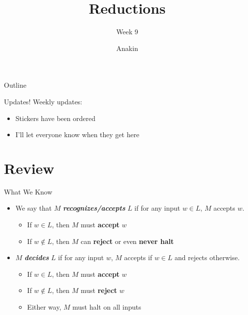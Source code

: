 \documentclass[aspectratio=169]{beamer}
\title{Reductions}
\subtitle{Week 9}
\author{Anakin}
\date{}
\begin{document}

\begin{frame}
\titlepage
\end{frame}

\begin{frame}{Outline}
  \tableofcontents
\end{frame}

\begin{frame}{Updates!}
  Weekly updates: \pause
  \begin{itemize}
    \item Stickers have been ordered
    \item I'll let everyone know when they get here
  \end{itemize}
\end{frame}

\section{Review}
\frame{\sectionpage}

\begin{frame}{What We Know}
    \begin{itemize}
        \item We say that $M$ \textbf{\textit{recognizes/accepts}} $L$ if for any input $w\in L$, $M$ accepts $w$. \pause
        \begin{itemize}
            \item If $w \in L$, then $M$ must \textbf{accept} $w$
            \item If $w \notin L$, then $M$ can \textbf{reject} or even \textbf{never halt} \pause
        \end{itemize}
        \item $M$ \textbf{\textit{decides}} $L$ if for any input $w$, $M$ accepts if $w \in L$ and rejects otherwise. \pause
        \begin{itemize}
            \item If $w \in L$, then $M$ must \textbf{accept} $w$
            \item If $w \notin L$, then $M$ must \textbf{reject} $w$ \pause
            \item Either way, $M$ must halt on all inputs
        \end{itemize}
    \end{itemize}
\end{frame}
\end{document}
